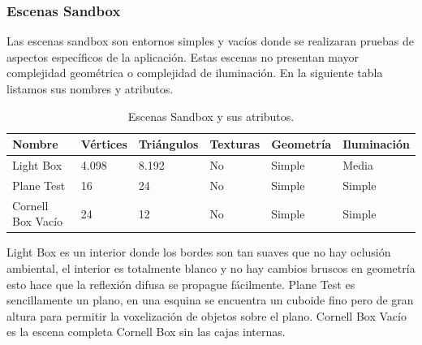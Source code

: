 \subsubsection{Escenas Sandbox}

Las escenas sandbox son entornos simples y vacíos donde se realizaran pruebas de aspectos específicos de la aplicación. Estas escenas no presentan mayor complejidad geométrica o complejidad de iluminación. En la siguiente tabla listamos sus nombres y atributos.

\begin{table}[h]
\centering
\label{my-label}
\begin{tabular}{|l|l|l|l|l|l|}
\hline
Nombre            & Vértices & Triángulos & Texturas & Geometría & Iluminación \\ \hline
Light Box         & 4.098    & 8.192      & No       & Simple    & Media        \\ \hline
Plane Test        & 16       & 24         & No       & Simple    & Simple       \\ \hline
Cornell Box Vacío & 24       & 12         & No       & Simple    & Simple       \\ \hline
\end{tabular}
\caption{Escenas Sandbox y sus atributos.}
\end{table}

Light Box es un interior donde los bordes son tan suaves que no hay oclusión ambiental, el interior es totalmente blanco y no hay cambios bruscos en geometría esto hace que la reflexión difusa se propague fácilmente. Plane Test es sencillamente un plano, en una esquina se encuentra un cuboide fino pero de gran altura para permitir la voxelización de objetos sobre el plano. Cornell Box Vacío es la escena completa Cornell Box sin las cajas internas.

